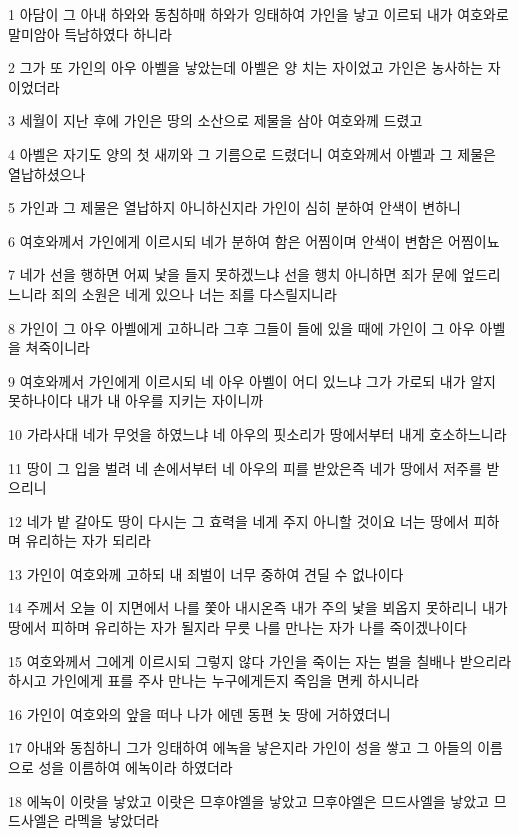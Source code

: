 \par 1 아담이 그 아내 하와와 동침하매 하와가 잉태하여 가인을 낳고 이르되 내가 여호와로 말미암아 득남하였다 하니라
\par 2 그가 또 가인의 아우 아벨을 낳았는데 아벨은 양 치는 자이었고 가인은 농사하는 자이었더라
\par 3 세월이 지난 후에 가인은 땅의 소산으로 제물을 삼아 여호와께 드렸고
\par 4 아벨은 자기도 양의 첫 새끼와 그 기름으로 드렸더니 여호와께서 아벨과 그 제물은 열납하셨으나
\par 5 가인과 그 제물은 열납하지 아니하신지라 가인이 심히 분하여 안색이 변하니
\par 6 여호와께서 가인에게 이르시되 네가 분하여 함은 어찜이며 안색이 변함은 어찜이뇨
\par 7 네가 선을 행하면 어찌 낯을 들지 못하겠느냐 선을 행치 아니하면 죄가 문에 엎드리느니라 죄의 소원은 네게 있으나 너는 죄를 다스릴지니라
\par 8 가인이 그 아우 아벨에게 고하니라 그후 그들이 들에 있을 때에 가인이 그 아우 아벨을 쳐죽이니라
\par 9 여호와께서 가인에게 이르시되 네 아우 아벨이 어디 있느냐 그가 가로되 내가 알지 못하나이다 내가 내 아우를 지키는 자이니까
\par 10 가라사대 네가 무엇을 하였느냐 네 아우의 핏소리가 땅에서부터 내게 호소하느니라
\par 11 땅이 그 입을 벌려 네 손에서부터 네 아우의 피를 받았은즉 네가 땅에서 저주를 받으리니
\par 12 네가 밭 갈아도 땅이 다시는 그 효력을 네게 주지 아니할 것이요 너는 땅에서 피하며 유리하는 자가 되리라
\par 13 가인이 여호와께 고하되 내 죄벌이 너무 중하여 견딜 수 없나이다
\par 14 주께서 오늘 이 지면에서 나를 쫓아 내시온즉 내가 주의 낯을 뵈옵지 못하리니 내가 땅에서 피하며 유리하는 자가 될지라 무릇 나를 만나는 자가 나를 죽이겠나이다
\par 15 여호와께서 그에게 이르시되 그렇지 않다 가인을 죽이는 자는 벌을 칠배나 받으리라 하시고 가인에게 표를 주사 만나는 누구에게든지 죽임을 면케 하시니라
\par 16 가인이 여호와의 앞을 떠나 나가 에덴 동편 놋 땅에 거하였더니
\par 17 아내와 동침하니 그가 잉태하여 에녹을 낳은지라 가인이 성을 쌓고 그 아들의 이름으로 성을 이름하여 에녹이라 하였더라
\par 18 에녹이 이랏을 낳았고 이랏은 므후야엘을 낳았고 므후야엘은 므드사엘을 낳았고 므드사엘은 라멕을 낳았더라
